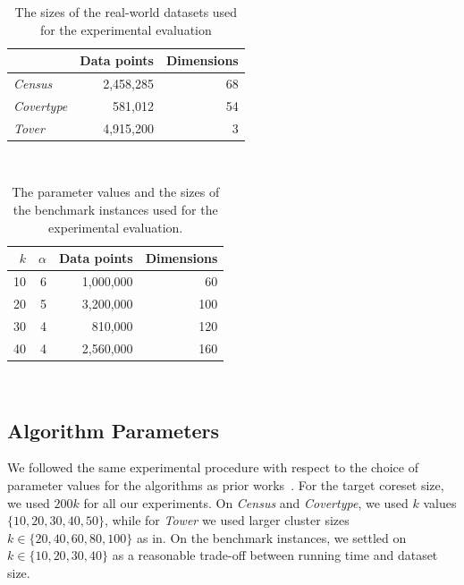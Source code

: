 %
\begin{table}
	\begin{center}%
	\caption{The sizes of the real-world datasets used for the experimental evaluation}
	\label{tab:real-world-datasets-overview}
	\begin{tabular}{lrr}
		\toprule
        
		    & Data points
		    & Dimensions
            \\
		\midrule
		\textit{Census}
    		& 2,458,285
    		& 68
    		\\
	    \textit{Covertype}
    	    & 581,012
    		& 54
    		\\
        \textit{Tover}
            & 4,915,200
    		& 3
    		\\
		\bottomrule
	\end{tabular}\\
	\end{center}
\end{table}



%
\begin{table}
	\begin{center}%
	\caption{The parameter values and the sizes of the benchmark instances used for the experimental evaluation.}
	\label{tab:benchmark-instances-overview}
	\begin{tabular}{rrrr}
		\toprule
        $k$
		    & $\alpha$
		    & Data points
		    & Dimensions
            \\
		\midrule
        10
    		& 6
    		& 1,000,000
    		& 60
    		\\
        20
    		& 5
    		& 3,200,000
    		& 100
    		\\
        30
    		& 4
    		& 810,000
    		& 120
    		\\
        40
    		& 4
    		& 2,560,000
    		& 160
    		\\
		\bottomrule
	\end{tabular}\\
	\end{center}
\end{table}

\subsection{Algorithm Parameters}
We followed the same experimental procedure with respect to the choice of parameter values for the algorithms as prior works~\cite{FGSSS13, AckermannMRSLS12}. For the target coreset size, we used $200k$ for all our experiments. On \textit{Census} and \textit{Covertype}, we used $k$ values $\{10, 20, 30, 40, 50\}$, while for \textit{Tower} we used larger cluster sizes $k \in \{20, 40, 60, 80, 100\}$ as in. On the benchmark instances, we settled on $k \in \{10, 20, 30, 40\}$ as a reasonable trade-off between running time and dataset size.




